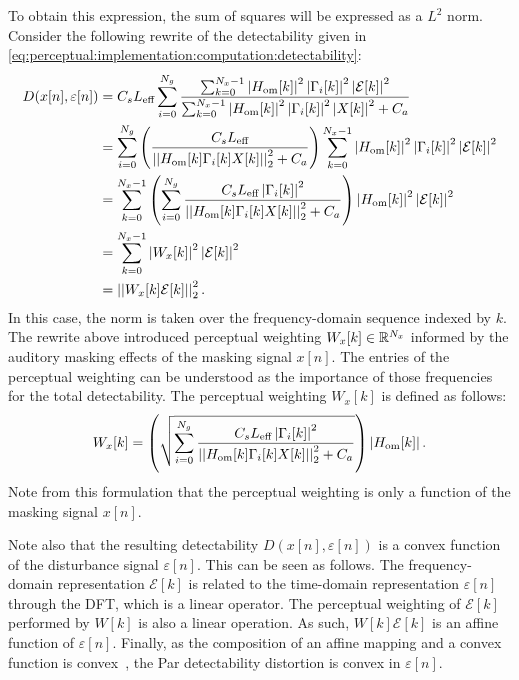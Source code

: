 To obtain this expression, the sum of squares will be expressed as a $L^2$ norm.
Consider the following rewrite of the detectability given in 
\autoref{eq:perceptual:implementation:computation:detectability}: 
\begin{align*}
    D(x[n],\varepsilon[n]) &= C_s L_\text{eff}\sum_{i=0}^{N_g}
                        \frac{\sum_{k=0}^{N_x-1}\left|H_\text{om}[k]\right|^2\left|
                            \Gamma_i[k]\right|^2\left|\mathcal{E}[k]\right|^2}
                        {\sum_{k=0}^{N_x-1}\left|H_\text{om}[k]\right|^2\left|
                            \Gamma_i[k]\right|^2\left|X[k]\right|^2 + C_a} \\
                           &= \sum_{i=0}^{N_g}
                           \left(\frac{C_s L_\text{eff}}{\norm[2][2]{H_\text{om}[k]\Gamma_i[k]X[k]} + C_a}\right)
                        \sum_{k=0}^{N_x-1}\left|H_\text{om}[k]\right|^2\left|
                        \Gamma_i[k]\right|^2\left|\mathcal{E}[k]\right|^2 \\
                           &= \sum_{k=0}^{N_x-1}\left(\sum_{i=0}^{N_g}
                            \frac{C_s L_\text{eff}\left|\Gamma_i[k]\right|^2}
                                 {\norm[2][2]{H_\text{om}[k]\Gamma_i[k]X[k]} + C_a}\right)
                        \left|H_\text{om}[k]\right|^2\left|\mathcal{E}[k]\right|^2 \\
                           &= \sum_{k=0}^{N_x-1}\left|W_x[k]\right|^2\left|\mathcal{E}[k]\right|^2 \\
                           &= \norm[2][2]{W_x[k]\mathcal{E}[k]}. 
\end{align*}
In this case, the norm is taken over the frequency-domain sequence indexed by $k$.
The rewrite above introduced perceptual weighting $W_x[k]\in\mathbb{R}^{N_x}$ informed by the auditory masking effects of the masking signal $x[n]$. 
The entries of the perceptual weighting can be understood as the importance of those frequencies for the total detectability.
The perceptual weighting $W_x[k]$ is defined as follows: 
\begin{equation}
    W_x[k] = \left(\sqrt{\sum_{i=0}^{N_g}\frac{C_s L_\text{eff}\left|\Gamma_i[k]\right|^2}
        {\norm[2][2]{H_\text{om}[k]\Gamma_i[k]X[k]} + C_a}}\right)
        \left|H_\text{om}[k]\right|.
\end{equation}
Note from this formulation that the perceptual weighting is only a function of the masking signal $x[n]$.

Note also that the resulting detectability $D(x[n],\varepsilon[n])$ is a convex function 
of the disturbance signal $\varepsilon[n]$. 
This can be seen as follows.
The frequency-domain representation $\mathcal{E}[k]$ is related to the 
time-domain representation $\varepsilon[n]$ through the DFT, which is a linear operator.
The perceptual weighting of $\mathcal{E}[k]$ performed by $W[k]$ is also a linear operation.
As such, $W[k]\mathcal{E}[k]$ is an affine function of $\varepsilon[n]$.
Finally, as the composition of an affine mapping and a convex function is convex~\cite{boyd2004convex},
the Par detectability distortion
is convex in $\varepsilon[n]$.

